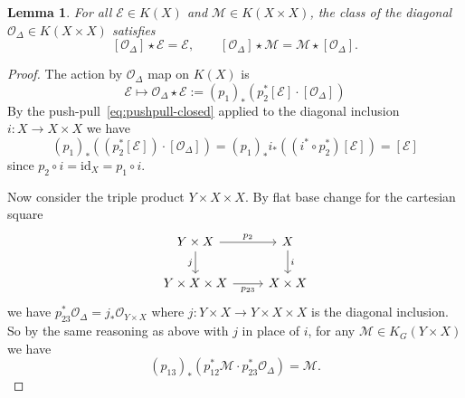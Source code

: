 \documentclass[11pt]{amsart}
\newtheorem{lemma}[dummy]{Lemma}
\theoremstyle{definition}
\newtheorem{remark}[dummy]{Remark}
\newcommand{\Mca}{\mathcal{M}}
\newcommand{\Ec}{\mathcal{E}}
\newcommand{\Oc}{\mathcal{O}}
\numberwithin{equation}{subsection}
\numberwithin{figure}{subsection}
\begin{document}
\begin{lemma}
For all $\Ec\in K(X)$ and $\Mca\in K(X\times X)$, the class of the diagonal $\Oc_\Delta\in K(X\times X)$ satisfies 
$$
[\Oc_\Delta]\star \Ec =\Ec,\qquad [\Oc_\Delta]\star \Mca = \Mca\star [\Oc_\Delta] .
$$
\end{lemma}

\begin{proof}
 The action by $\Oc_\Delta$ map on $K(X)$ is
$$
\Ec\mapsto \Oc_\Delta\star \Ec:=(p_1)_*\left(p_2^*[\Ec]\cdot [\Oc_{\Delta}]\right)
$$
By the push-pull~\eqref{eq:pushpull-closed} applied to the diagonal inclusion $i:X\rightarrow X\times X$ we have 
$$
(p_1)_*\left((p_2^*[\Ec])\cdot[\Oc_\Delta]\right) 
=(p_1)_*i_*((i^*\circ p_2^*)[\Ec])=[\Ec]
$$
since $p_2\circ i = \mathrm{id}_X=p_1\circ i$.

Now consider the triple product $Y\times X\times X$. By flat base change for the cartesian square
$$
\begin{tikzcd}
Y\times X \arrow{r}{p_2} \arrow[swap]{d}{j}& X \arrow{d}{i} \\
Y\times X\times X \arrow[swap]{r}{p_{23}} & X\times X
\end{tikzcd}
$$
we have $p_{23}^*\Oc_\Delta = j_*\Oc_{Y\times X}$ where $j:Y\times X\rightarrow Y\times X\times X$ is the diagonal inclusion.
So by the same reasoning as above with $j$ in place of $i$, for any $\mathcal{M} \in K_G(Y\times X)$ we have
$$
(p_{13})_*\left(p_{12}^*\mathcal{M}\cdot p_{23}^*\Oc_\Delta\right)=\mathcal{M}.
$$

\end{proof}
\end{document}
